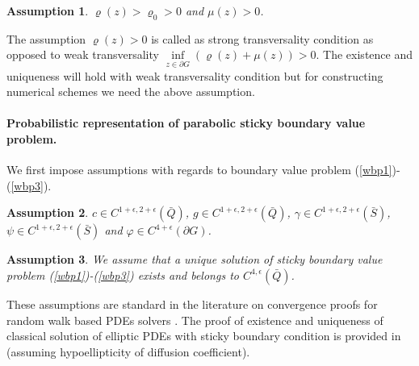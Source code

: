 \documentclass{article}
\newtheorem{assumption}{Assumption}[section]
\theoremstyle{definition}
\numberwithin{equation}{section}
\begin{document}
\begin{assumption}\label{sticky_assum} $ \varrho(z) > \varrho_0 > 0$ and $ \mu(z) > 0$.
\end{assumption}

The assumption $ \varrho(z) > 0$  is called as strong transversality condition as opposed to weak transversality $\inf\limits_{z \in \partial G}(\varrho(z) + \mu(z)) > 0 $. The existence and uniqueness will hold with weak transversality condition but for constructing numerical schemes we need the above assumption. 

\paragraph{Probabilistic representation of parabolic sticky boundary value problem.} We first impose assumptions with regards to boundary value problem (\ref{wbp1})-(\ref{wbp3}).
 
 \begin{assumption}\label{coeff_assum2}
 $c \in C^{1+\epsilon, 2+ \epsilon}(\bar{Q})$, $g \in C^{1+\epsilon, 2+ \epsilon}(\bar{Q})$, $ \gamma \in C^{1+\epsilon, 2+ \epsilon}(\bar{S})$, $ \psi \in C^{1+\epsilon, 2+ \epsilon}(\bar{S}) $ and $ \varphi \in C^{ 4+ \epsilon}(\partial G) $.
 \end{assumption}



\begin{assumption}\label{ellip_assum}
    We assume that a unique solution of sticky boundary value problem (\ref{wbp1})-(\ref{wbp3}) exists and belongs to $C^{4, \epsilon}(\bar{Q})$. 
\end{assumption}
These assumptions are standard in the literature on convergence proofs for random walk based PDEs solvers   \cite{mil_tretyakov_book, milstein2003simplest_dirichlet}.  The proof of existence and uniqueness of classical solution of elliptic PDEs with sticky boundary condition is provided in \cite{cattiaux1992} (assuming hypoellipticity of diffusion coefficient).
\end{document}
